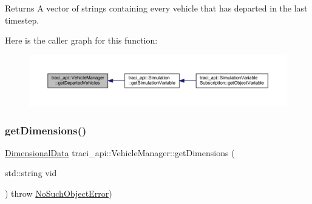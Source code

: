 \begin{DoxyReturn}{Returns}
A vector of strings containing every vehicle that has departed in the last timestep. 
\end{DoxyReturn}
Here is the caller graph for this function\+:\nopagebreak
\begin{figure}[H]
\begin{center}
\leavevmode
\includegraphics[width=350pt]{classtraci__api_1_1_vehicle_manager_ae88de975fe459842df9a412c552641ea_icgraph}
\end{center}
\end{figure}
\mbox{\label{classtraci__api_1_1_vehicle_manager_a626f8aea7366479ec9bdd49f58f5b530}} 
\subsubsection{\texorpdfstring{get\+Dimensions()}{getDimensions()}}
{\footnotesize\ttfamily \hyperlink{class_dimensional_data}{Dimensional\+Data} traci\+\_\+api\+::\+Vehicle\+Manager\+::get\+Dimensions (\begin{DoxyParamCaption}\item[{std\+::string}]{vid }\end{DoxyParamCaption}) throw  \hyperlink{classtraci__api_1_1_no_such_object_error}{No\+Such\+Object\+Error}) }

